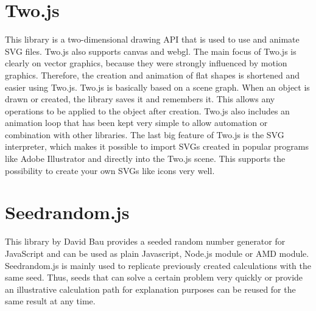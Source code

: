 \section{Two.js}
\label{sec:tecTwo}
This library is a two-dimensional drawing API that is used to use and animate SVG files. Two.js also supports canvas and webgl. The main focus of Two.js is clearly on vector graphics, because they were strongly influenced by motion graphics. Therefore, the creation and animation of flat shapes is shortened and easier using Two.js. Two.js is basically based on a scene graph. When an object is drawn or created, the library saves it and remembers it. This allows any operations to be applied to the object after creation. Two.js also includes an animation loop that has been kept very simple to allow automation or combination with other libraries. The last big feature of Two.js is the SVG interpreter, which makes it possible to import SVGs created in popular programs like Adobe Illustrator and directly into the Two.js scene. This supports the possibility to create your own SVGs like icons very well. \cite{TwoJsAuthors2019}

\section{Seedrandom.js}
\label{sec:tecSeed}
This library by David Bau provides a seeded random number generator for JavaScript and can be used as plain Javascript, Node.js module or AMD module. Seedrandom.js is mainly used to replicate previously created calculations with the same seed. Thus, seeds that can solve a certain problem very quickly or provide an illustrative calculation path for explanation purposes can be reused for the same result at any time. \cite{Bau2019}

